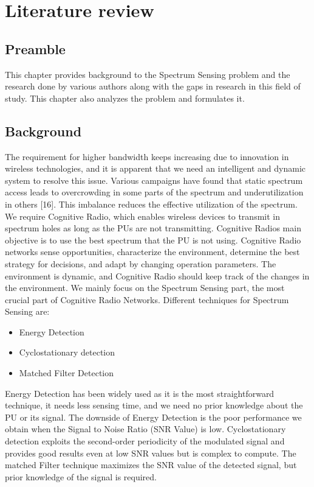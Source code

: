 \chapter{Literature review}
\label{mathchapter}


\section{Preamble}
This chapter provides background to the Spectrum Sensing problem and the research done by various authors along with the gaps in research in this field of study. This chapter also analyzes the problem and formulates it.


\section{Background}
The requirement for higher bandwidth keeps increasing due to innovation in wireless technologies, and it is apparent that we need an intelligent and dynamic system to resolve this issue. Various campaigns have found that static spectrum access leads to overcrowding in some parts of the spectrum and underutilization in others [16]. This imbalance reduces the effective utilization of the spectrum. We require Cognitive Radio, which enables wireless devices to transmit in spectrum holes as long as the PUs are not transmitting. Cognitive Radios main objective is to use the best spectrum that the PU is not using. Cognitive Radio networks sense opportunities, characterize the environment, determine the best strategy for decisions, and adapt by changing operation parameters. The environment is dynamic, and Cognitive Radio should keep track of the changes in the environment. We mainly focus on the Spectrum Sensing part, the most crucial part of Cognitive Radio Networks. Different techniques for Spectrum Sensing are:
\begin{itemize}	
\item Energy Detection
\item Cyclostationary detection
\item Matched Filter Detection
\end{itemize}
Energy Detection has been widely used as it is the most straightforward technique, it needs less sensing time, and we need no prior knowledge about the PU or its signal. The downside of Energy Detection is the poor performance we obtain when the Signal to Noise Ratio (SNR Value) is low. Cyclostationary detection exploits the second-order periodicity of the modulated signal and provides good results even at low SNR values but is complex to compute. The matched Filter technique maximizes the SNR value of the detected signal, but prior knowledge of the signal is required.


